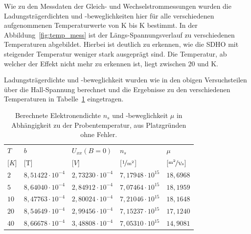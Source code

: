 
Wie zu den Messdaten der Gleich- und Wechselstrommessungen wurden die Ladungsträgerdichten und -beweglichkeiten hier für alle verschiedenen aufgenommenen Temperaturwerte von \unit[2]{K} bis \unit[40]{K} bestimmt. In der Abbildung~\ref{fig:temp_mess} ist der Längs-Spannungsverlauf zu verschiedenen Temperaturen abgebildet. Hierbei ist deutlich zu erkennen, wie die SDHO mit steigender Temperatur weniger stark ausgeprägt sind. Die Temperatur, ab welcher der Effekt nicht mehr zu erkennen ist, liegt zwischen $20$ und \unit[40]{K}.

Ladungsträgerdichte und -beweglichkeit wurden wie in den obigen Versuchsteilen über die Hall-Spannung berechnet und die Ergebnisse zu den verschiedenen Temperaturen in Tabelle~\ref{tab:temp_ausw} eingetragen.

\begin{table}[h]
	\centering
	\begin{tabular}{|l|r|l|r|r|}
		\hline
		\multicolumn{1}{|l|}{\cellcolor{black!30} $T$ } & \multicolumn{1}{|l|}{\cellcolor{black!30} $b$ } & \multicolumn{1}{|l|}{\cellcolor{black!30} $U_{xx}(B=0)$ } & \multicolumn{1}{|l|}{\cellcolor{black!30} $n_s$ } & \multicolumn{1}{|l|}{\cellcolor{black!30} $\mu$ } \\
		\multicolumn{1}{|l|}{\cellcolor{black!30} [$\unit{K}$] } &  \multicolumn{1}{|l|}{\cellcolor{black!30} [\unit{T}] } &
		\multicolumn{1}{|l|}{\cellcolor{black!30} [$\unit{V}$] } &  \multicolumn{1}{|l|}{\cellcolor{black!30} [$\unitfrac{1}{m^2}$] } & \multicolumn{1}{|l|}{\cellcolor{black!30} [$\unitfrac{m^2}{Vs}$] } \\ \hline
		$ 2 $  & $ 8,51422\cdot 10^{-4} $  & $ 2,73230\cdot 10^{-4} $  & $ 7,17948\cdot 10^{15} $  & $ 18,6968 $  \\ 
		$ 5 $  & $ 8,64040\cdot 10^{-4} $  & $ 2,84912\cdot 10^{-4} $  & $ 7,07464\cdot 10^{15} $  & $ 18,1959 $  \\ 
		$ 10 $  & $ 8,47763\cdot 10^{-4} $  & $ 2,80024\cdot 10^{-4} $  & $ 7,21046\cdot 10^{15} $  & $ 18,1648 $  \\ 
		$ 20 $  & $ 8,54649\cdot 10^{-4} $  & $ 2,99456\cdot 10^{-4} $  & $ 7,15237\cdot 10^{15} $  & $ 17,1240 $  \\ 
		$ 40 $  & $ 8,66678\cdot 10^{-4} $  & $ 3,48808\cdot 10^{-4} $  & $ 7,05310\cdot 10^{15} $  & $ 14,9081 $  \\ \hline
	\end{tabular}
	\caption{Berechnete Elektronendichte $n_s$ und -beweglichkeit $\mu$ in Abhängigkeit zu der Probentemperatur, aus Platzgründen ohne Fehler.}
	\label{tab:temp_ausw}
\end{table}


